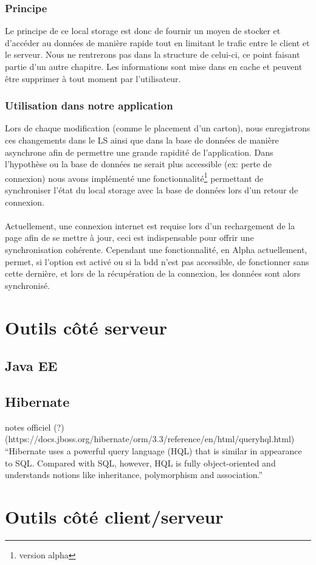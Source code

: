 \subsubsection{Principe}
Le principe de ce local storage est donc de fournir un moyen de stocker et d'accéder au données de manière rapide tout en limitant le trafic entre le client et le serveur. Nous ne rentrerons pas dans la structure de celui-ci, ce point faisant partie d'un autre chapitre. Les informations sont mise dans en cache et peuvent être supprimer à tout moment par l'utilisateur.
\subsubsection{Utilisation dans notre application}
Lors de chaque modification (comme le placement d'un carton), nous enregistrons ces changements dans le LS ainsi que dans la base de données de manière asynchrone afin de permettre une grande rapidité de l'application. Dans l'hypothèse ou la base de données ne serait plus accessible (ex: perte de connexion) nous avons implémenté une fonctionnalité\footnote{version alpha} permettant de synchroniser l'état du local storage avec la base de données lors d'un retour de connexion.\\
\\
Actuellement, une connexion internet est requise lors d'un rechargement de la page afin de se mettre à jour, ceci est indispensable pour offrir une synchronisation cohérente. Cependant une fonctionnalité, en Alpha actuellement, permet, si l'option est activé ou si la bdd n'est pas accessible, de fonctionner sans cette dernière, et lors de la récupération de la connexion, les données sont alors synchronisé.



\section{Outils côté serveur}


\subsection{Java EE}


\subsection{Hibernate}
notes officiel (?)
(https://docs.jboss.org/hibernate/orm/3.3/reference/en/html/queryhql.html)\\

``Hibernate uses a powerful query language (HQL) that is similar in appearance to SQL. Compared with SQL, however, HQL is fully object-oriented and understands notions like inheritance, polymorphism and association.''


\section{Outils côté client/serveur}





